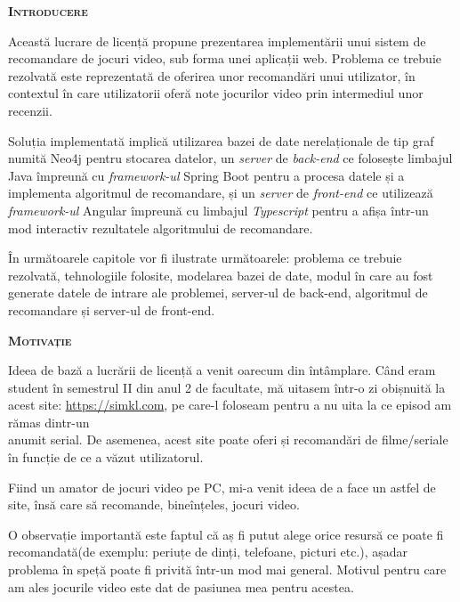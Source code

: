 \documentclass[12pt,a4paper]{report}
\begin{document}
\newpage
   
\renewcommand*{\contentsname}{Cuprins}
\tableofcontents
\newpage

\hfill \break

	\hfill \break
	\begin{center}
	{\scshape\large \textbf{Introducere} \par}
	\end{center}
	
	Această lucrare de licență propune prezentarea implementării unui sistem de recomandare de jocuri video, sub forma unei aplicații web. Problema ce trebuie rezolvată este reprezentată de oferirea unor recomandări unui utilizator, în contextul în care utilizatorii oferă note jocurilor video prin intermediul unor recenzii. 
	
	Soluția implementată implică utilizarea bazei de date nerelaționale de tip graf numită Neo4j pentru stocarea datelor, un \emph{server} de \emph{back-end} ce folosește limbajul Java împreună cu \emph{framework-ul} Spring Boot pentru a procesa datele și a implementa algoritmul de recomandare, și un \emph{server} de \emph{front-end} ce utilizează \emph{framework-ul} Angular împreună cu limbajul \emph{Typescript} pentru a afișa într-un mod interactiv rezultatele algoritmului de recomandare. 
	
	În următoarele capitole vor fi ilustrate următoarele: problema ce trebuie rezolvată, tehnologiile folosite, modelarea bazei de date, modul în care au fost generate datele de intrare ale problemei, server-ul de back-end, algoritmul de recomandare și server-ul de front-end.
	
	\bigskip

	{\scshape\normalsize \textbf{Motivație} \par}
	
	\bigskip

	Ideea de bază a lucrării de licență a venit oarecum din întâmplare. Când eram student în semestrul II din anul 2 de facultate, mă uitasem într-o zi obișnuită la acest site: \href{https://simkl.com/}{https://simkl.com}, pe care-l foloseam pentru a nu uita la ce episod am rămas dintr-un\\ anumit serial. De asemenea, acest site poate oferi și recomandări de filme/seriale în funcție de ce a văzut utilizatorul.
	
	Fiind un amator de jocuri video pe PC, mi-a venit ideea de a face un astfel de site, însă care să recomande, bineînțeles, jocuri video.
	
	O observație importantă este faptul că aș fi putut alege orice resursă ce poate fi recomandată(de exemplu: periuțe de dinți, telefoane, picturi etc.), așadar problema în speță poate fi privită într-un mod mai general. Motivul pentru care am ales jocurile video este dat de pasiunea mea pentru acestea.
	
\end{document}
